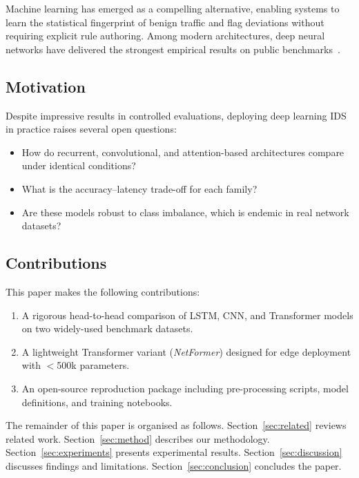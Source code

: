 \documentclass[conference]{IEEEtran}
\begin{document}
Machine learning has emerged as a compelling alternative, enabling
systems to learn the statistical fingerprint of benign traffic and
flag deviations without requiring explicit rule authoring. Among
modern architectures, deep neural networks have delivered the strongest
empirical results on public benchmarks~\cite{ref:ring2019}.

\subsection{Motivation}

Despite impressive results in controlled evaluations, deploying deep
learning IDS in practice raises several open questions:
\begin{itemize}
	\item How do recurrent, convolutional, and attention-based
	      architectures compare under identical conditions?
	\item What is the accuracy--latency trade-off for each family?
	\item Are these models robust to class imbalance, which is endemic
	      in real network datasets?
\end{itemize}

\subsection{Contributions}

This paper makes the following contributions:
\begin{enumerate}
	\item A rigorous head-to-head comparison of LSTM, CNN, and
	      Transformer models on two widely-used benchmark datasets.
	\item A lightweight Transformer variant (\textit{NetFormer})
	      designed for edge deployment with $<$500k parameters.
	\item An open-source reproduction package including pre-processing
	      scripts, model definitions, and training notebooks.
\end{enumerate}

The remainder of this paper is organised as follows.
Section~\ref{sec:related} reviews related work.
Section~\ref{sec:method} describes our methodology.
Section~\ref{sec:experiments} presents experimental results.
Section~\ref{sec:discussion} discusses findings and limitations.
Section~\ref{sec:conclusion} concludes the paper.

\end{document}
